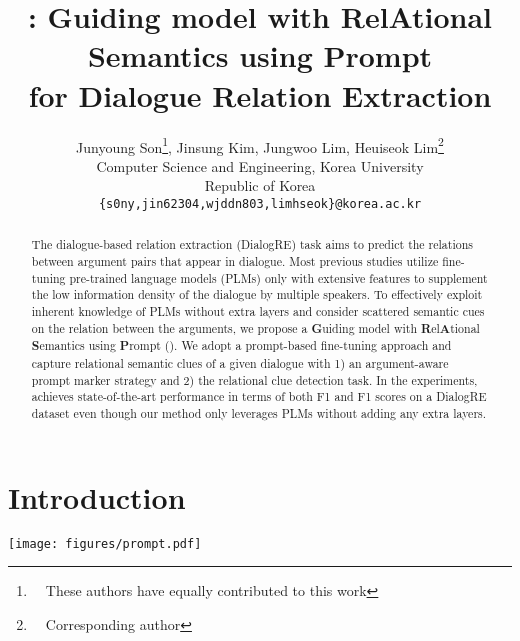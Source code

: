 \documentclass[11pt]{article}
\title{
: Guiding model with RelAtional Semantics using Prompt\\
for Dialogue Relation Extraction
}
\author{Junyoung Son\thanks{~~These authors have equally contributed to this work}, Jinsung Kim\footnotemark[1], Jungwoo Lim\footnotemark[1], Heuiseok Lim\thanks{~~Corresponding author} \\
Computer Science and Engineering, Korea University \\
Republic of Korea \\
\texttt{\{s0ny,jin62304,wjddn803,limhseok\}@korea.ac.kr}
}
\begin{document}
\maketitle
\begin{abstract}
The dialogue-based relation extraction (DialogRE) task aims to predict the relations between argument pairs that appear in dialogue. Most previous studies utilize fine-tuning pre-trained language models (PLMs) only with extensive features to supplement the low information density of the dialogue by multiple speakers. To effectively exploit inherent knowledge of PLMs without extra layers and consider scattered semantic cues on the relation between the arguments, we propose a \textbf{G}uiding model with \textbf{R}el\textbf{A}tional \textbf{S}emantics using \textbf{P}rompt (). We adopt a prompt-based fine-tuning approach and capture relational semantic clues of a given dialogue with 1) an argument-aware prompt marker strategy and 2) the relational clue detection task. In the experiments,  achieves state-of-the-art performance in terms of both F1 and F1 scores on a DialogRE dataset even though our method only leverages PLMs without adding any extra layers.
\end{abstract}

\section{Introduction}
\label{intro}
\begin{figure*}[ht]
    \centering
    \texttt{[image: figures/prompt.pdf]}
    \caption{An illustration of (1) standard fine-tuning approach, and (2) prompt-based fine-tuning approach. In prompt-based fine-tuning approach, a set of \textit{label words} are mapped into a \textit{class set} by a certain mapping function.\label{fig:finetune_prompt}}
\end{figure*} 
\end{document}
